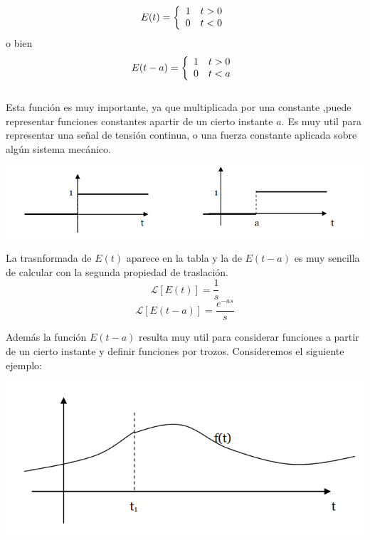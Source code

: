 \documentclass[]{article}
\begin{document}
\normalsize


$$
E(t) = \left\{
	\begin{array}{ll}
		1 \hspace{10pt} t > 0 \\
		0 \hspace{10pt} t < 0
	\end{array}
\right. \\
$$
o bien
$$
E(t-a) = \left\{
	\begin{array}{ll}
		1 \hspace{10pt} t > 0 \\
		0 \hspace{10pt} t < a
	\end{array}
\right. \\
$$
\\
Esta función es muy importante, ya que multiplicada por una constante ,puede representar funciones constantes apartir de un cierto instante $a$. Es muy util para representar una señal de tensión continua, o una fuerza constante aplicada sobre algún sistema mecánico.

\includegraphics{../../../Imagenes/Superior/Superior02.PNG}

La trasnformada de $E(t)$ aparece en la tabla y la de $E(t-a)$ es muy sencilla de calcular con la segunda propiedad de traslación.
$$
\mathscr{L}[E(t)] = \frac{1}{s}
$$
$$
\mathscr{L}[E(t-a)] = \frac{e^{-as}}{s}
$$

Además la función $E(t-a)$ resulta muy util para considerar funciones a partir de un cierto instante y definir funciones por trozos.
Consideremos el siguiente ejemplo:

\includegraphics{../../../Imagenes/Superior/Superior03.PNG}
\end{document}
